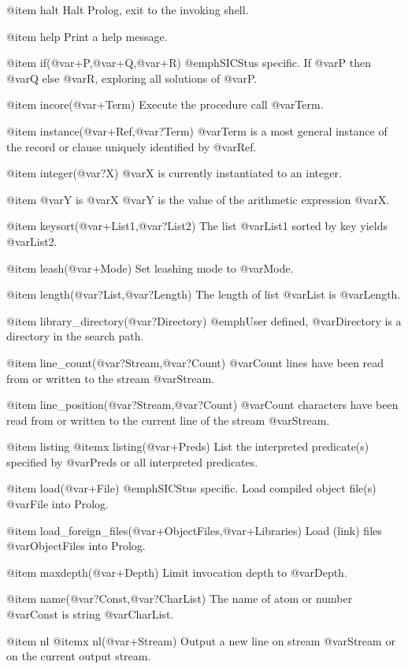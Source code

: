 {{{{{@item halt
Halt Prolog, exit to the invoking shell.

@item help
Print a help message.

@item if(@var{+P},@var{+Q},@var{+R})
@emph{SICStus specific.} If @var{P} then @var{Q} else @var{R}, exploring
all solutions of @var{P}.

@item incore(@var{+Term})
Execute the procedure call @var{Term}.

@item instance(@var{+Ref},@var{?Term})
@var{Term} is a most general instance of the record or clause uniquely
identified by @var{Ref}.

@item integer(@var{?X})
@var{X} is currently instantiated to an integer.

@item @var{Y} is @var{X}
@var{Y} is the value of the arithmetic expression @var{X}.

@item keysort(@var{+List1},@var{?List2})
The list @var{List1} sorted by key yields @var{List2}.

@item leash(@var{+Mode})
Set leashing mode to @var{Mode}.

@item length(@var{?List},@var{?Length})
The length of list @var{List} is @var{Length}.

@item library_directory(@var{?Directory})
@emph{User defined}, @var{Directory} is a directory in the search path.

@item line_count(@var{?Stream},@var{?Count})
@var{Count} lines have been read from or written to the stream
@var{Stream}.

@item line_position(@var{?Stream},@var{?Count})
@var{Count} characters have been read from or written to the current
line of the stream @var{Stream}.

@item listing
@itemx listing(@var{+Preds})
List the interpreted predicate(s) specified by @var{Preds} or all
interpreted predicates.

@item load(@var{+File})
@emph{SICStus specific.} Load compiled object file(s) @var{File} into
Prolog.

@item load_foreign_files(@var{+ObjectFiles},@var{+Libraries})
Load (link) files @var{ObjectFiles} into Prolog.

@item maxdepth(@var{+Depth})
Limit invocation depth to @var{Depth}.

@item name(@var{?Const},@var{?CharList})
The name of atom or number @var{Const} is string @var{CharList}.

@item nl
@itemx nl(@var{+Stream})
Output a new line on stream @var{Stream} or on the current output stream.

}}}}}
